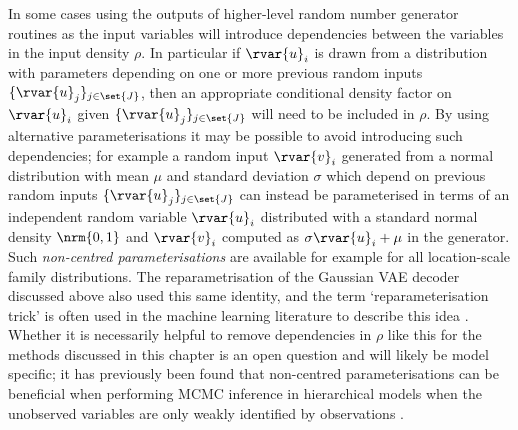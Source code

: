 In some cases using the outputs of higher-level random number generator routines as the input variables will introduce dependencies between the variables in the input density $\rho$. In particular if $\rvar{u}_i$ is drawn from a distribution with parameters depending on one or more previous random inputs $\lbrace \rvar{u}_j\rbrace_{j\in\set{J}}$, then an appropriate conditional density factor on $\rvar{u}_i$ given $\lbrace \rvar{u}_j\rbrace_{j\in\set{J}}$ will need to be included in $\rho$. By using alternative parameterisations it may be possible to avoid introducing such dependencies; for example a random input $\rvar{v}_i$ generated from a normal distribution with mean $\mu$ and standard deviation $\sigma$ which depend on previous random inputs $\lbrace \rvar{u}_j\rbrace_{j\in\set{J}}$ can instead be parameterised in terms of an independent random variable $\rvar{u}_i$ distributed with a standard normal density $\nrm{0,1}$ and $\rvar{v}_i$ computed as $\sigma \rvar{u}_i + \mu$ in the generator. Such \emph{non-centred parameterisations} \citep{price1958useful,bonnet1964transformations,papaspiliopoulos2007general} are available for example for all location-scale family distributions. The reparametrisation of the Gaussian \ac{VAE} decoder discussed above also used this same identity, and the term `reparameterisation trick' is often used in the machine learning literature to describe this idea \citep{kingma2013auto}. Whether it is necessarily helpful to remove dependencies in $\rho$ like this for the methods discussed in this chapter is an open question and will likely be model specific; it has previously been found that non-centred parameterisations can be beneficial when performing \ac{MCMC} inference in hierarchical models when the unobserved variables are only weakly identified by observations \citep{papaspiliopoulos2003non,papaspiliopoulos2007general,betancourt2015hamiltonian}.  %





